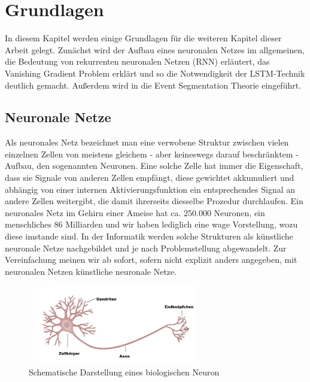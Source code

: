 \chapter{Grundlagen} 
\label{ch:grundlagen}
In diesem Kapitel werden einige Grundlagen für die weiteren Kapitel dieser Arbeit gelegt. Zunächst wird der Aufbau eines neuronalen Netzes im allgemeinen, die Bedeutung von rekurrenten neuronalen Netzen (RNN) erläutert, das Vanishing Gradient Problem  erklärt und so die Notwendigkeit der LSTM-Technik deutlich gemacht. Außerdem wird in die Event Segmentation Theorie eingeführt.
\section{Neuronale Netze}
Als neuronales Netz bezeichnet man eine verwobene Struktur zwischen vielen einzelnen Zellen von meistens gleichem - aber keineswegs darauf beschr\"anktem - Aufbau, den sogenannten Neuronen. Eine solche Zelle hat immer die Eigenschaft, dass sie Signale von anderen Zellen empfängt, diese gewichtet akkumuliert und abhängig von einer internen Aktivierungsfunktion ein entsprechendes Signal an andere Zellen weitergibt, die damit ihrerseits diesselbe Prozedur durchlaufen. Ein neuronales Netz im Gehirn einer Ameise hat ca. 250.000 Neuronen, ein menschliches 86 Milliarden \cite{bib:number} und wir haben lediglich eine wage Vorstellung, wozu diese imstande sind. In der Informatik werden solche Strukturen als künstliche neuronale Netze nachgebildet und je nach Problemstellung abgewandelt. Zur Vereinfachung meinen wir ab sofort, sofern nicht explizit anders angegeben, mit neuronalen Netzen künstliche neuronale Netze.
\begin{figure}
	\centering
	\includegraphics[width=0.7\textwidth, height=130px]{pics/neuron.jpg}	
	\caption{Schematische Darstellung eines biologischen Neuron \cite{bib:neuron}}
	\label{img:neuron}
\end{figure}
